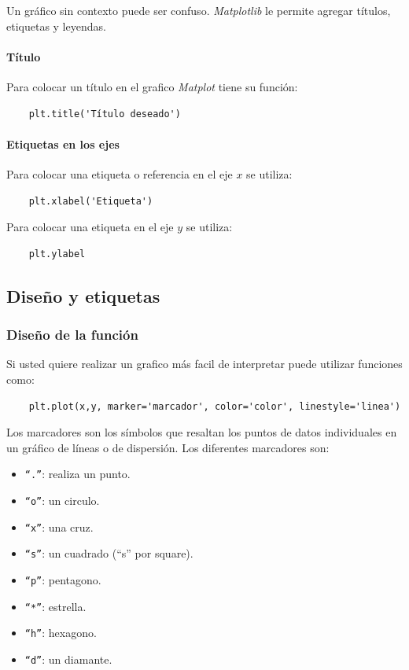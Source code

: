Un gráfico sin contexto puede ser confuso. \textit{Matplotlib} le permite agregar títulos, etiquetas y leyendas. 

\paragraph{Título}

Para colocar un título en el grafico \textit{Matplot} tiene su función:
\begin{verbatim}
    plt.title('Título deseado')
\end{verbatim}

\paragraph{Etiquetas en los ejes}

Para colocar una etiqueta o referencia en el eje \(x\) se utiliza:
\begin{verbatim}
    plt.xlabel('Etiqueta')
\end{verbatim}

Para colocar una etiqueta en el eje \(y\) se utiliza:
\begin{verbatim}
    plt.ylabel
\end{verbatim}

\paragraph{}

\subsection{Diseño y etiquetas}

\subsubsection{Diseño de la función}

Si usted quiere realizar un grafico más facil de interpretar puede utilizar funciones como:
\begin{verbatim}
    plt.plot(x,y, marker='marcador', color='color', linestyle='linea')
\end{verbatim}

Los marcadores son los símbolos que resaltan los puntos de datos individuales en un gráfico de líneas o de dispersión. Los diferentes marcadores son: 
\begin{itemize}
    \item \texttt{``.''}: realiza un punto.
    \item \texttt{``o''}: un circulo.
    \item \texttt{``x''}: una cruz.
    \item \texttt{``s''}: un cuadrado (``s'' por square).
    \item \texttt{``p''}: pentagono.
    \item \texttt{``*''}: estrella.
    \item \texttt{``h''}: hexagono.
    \item \texttt{``d''}: un diamante.
\end{itemize}

